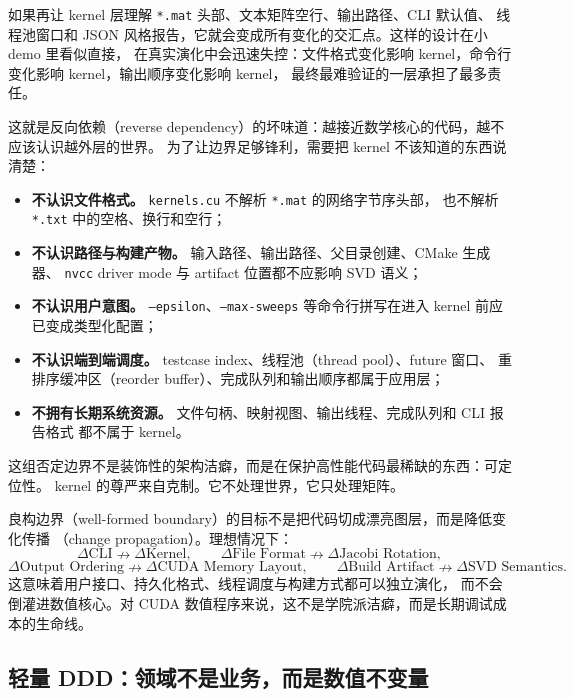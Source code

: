 如果再让 kernel 层理解 \texttt{*.mat} 头部、文本矩阵空行、输出路径、CLI 默认值、
线程池窗口和 JSON 风格报告，它就会变成所有变化的交汇点。这样的设计在小 demo 里看似直接，
在真实演化中会迅速失控：文件格式变化影响 kernel，命令行变化影响 kernel，输出顺序变化影响 kernel，
最终最难验证的一层承担了最多责任。

这就是反向依赖（reverse dependency）的坏味道：越接近数学核心的代码，越不应该认识越外层的世界。
为了让边界足够锋利，需要把 kernel 不该知道的东西说清楚：

\begin{itemize}
    \item \textbf{不认识文件格式。} \texttt{kernels.cu} 不解析 \texttt{*.mat} 的网络字节序头部，
          也不解析 \texttt{*.txt} 中的空格、换行和空行；
    \item \textbf{不认识路径与构建产物。} 输入路径、输出路径、父目录创建、CMake 生成器、
          \texttt{nvcc} driver mode 与 artifact 位置都不应影响 SVD 语义；
    \item \textbf{不认识用户意图。} \texttt{--epsilon}、\texttt{--max-sweeps}
          等命令行拼写在进入 kernel 前应已变成类型化配置；
    \item \textbf{不认识端到端调度。} testcase index、线程池（thread pool）、future 窗口、
          重排序缓冲区（reorder buffer）、完成队列和输出顺序都属于应用层；
    \item \textbf{不拥有长期系统资源。} 文件句柄、映射视图、输出线程、完成队列和 CLI 报告格式
          都不属于 kernel。
\end{itemize}

这组否定边界不是装饰性的架构洁癖，而是在保护高性能代码最稀缺的东西：可定位性。
kernel 的尊严来自克制。它不处理世界，它只处理矩阵。

良构边界（well-formed boundary）的目标不是把代码切成漂亮图层，而是降低变化传播
（change propagation）。理想情况下：
\[
    \Delta\text{CLI}
    \nrightarrow
    \Delta\text{Kernel},
    \qquad
    \Delta\text{File Format}
    \nrightarrow
    \Delta\text{Jacobi Rotation},
\]
\[
    \Delta\text{Output Ordering}
    \nrightarrow
    \Delta\text{CUDA Memory Layout},
    \qquad
    \Delta\text{Build Artifact}
    \nrightarrow
    \Delta\text{SVD Semantics}.
\]
这意味着用户接口、持久化格式、线程调度与构建方式都可以独立演化，
而不会倒灌进数值核心。对 CUDA 数值程序来说，这不是学院派洁癖，而是长期调试成本的生命线。

\subsection{轻量 DDD：领域不是业务，而是数值不变量}

